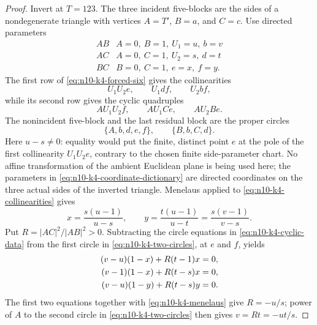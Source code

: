 \begin{proof}
Invert at $T=123$.  The three incident five-blocks are the sides of a
nondegenerate triangle with vertices
$A=T'$, $B=a$, and $C=c$.  Use directed parameters
\begin{equation}\label{eq:n10-k4-coordinate-dictionary}
\begin{array}{c|c}
AB&A=0,\ B=1,\ U_1=u,\ b=v\\
AC&A=0,\ C=1,\ U_2=s,\ d=t\\
BC&B=0,\ C=1,\ e=x,\ f=y.
\end{array}
\end{equation}
The first row of \eqref{eq:n10-k4-forced-six} gives the collinearities
\begin{equation}\label{eq:n10-k4-collinearities}
 U_1U_2e,\qquad U_1df,\qquad U_2bf,
\end{equation}
while its second row gives the cyclic quadruples
\begin{equation}\label{eq:n10-k4-cyclic-data}
 AU_1U_2f,\qquad AU_1Ce,\qquad AU_2Be.
\end{equation}
The nonincident five-block and the last residual block are the proper
circles
\begin{equation}\label{eq:n10-k4-two-circles}
\{A,b,d,e,f\},\qquad\{B,b,C,d\}.
\end{equation}
Here \(u-s\ne0\): equality would put the finite, distinct point \(e\) at
the pole of the first collinearity \(U_1U_2e\), contrary to the chosen
finite side-parameter chart.  No affine transformation of the ambient
Euclidean plane is being used here; the parameters in
\eqref{eq:n10-k4-coordinate-dictionary} are directed coordinates on the
three actual sides of the inverted triangle.
Menelaus applied to \eqref{eq:n10-k4-collinearities} gives
\begin{equation}\label{eq:n10-k4-menelaus}
 x=\frac{s(u-1)}{u-s},\qquad
 y=\frac{t(u-1)}{u-t}=\frac{s(v-1)}{v-s}.
\end{equation}
Put $R=|AC|^2/|AB|^2>0$.  Subtracting the circle equations in
\eqref{eq:n10-k4-cyclic-data} from the first circle in
\eqref{eq:n10-k4-two-circles}, at $e$ and $f$, yields
\begin{align}
 (v-u)(1-x)+R(t-1)x&=0,\notag\\
 (v-1)(1-x)+R(t-s)x&=0,\label{eq:n10-k4-power-three}\\
 (v-u)(1-y)+R(t-s)y&=0.\notag
\end{align}
The first two equations together with \eqref{eq:n10-k4-menelaus} give
$R=-u/s$; power of $A$ to the second circle in
\eqref{eq:n10-k4-two-circles} then gives $v=Rt=-ut/s$.

\end{proof}
